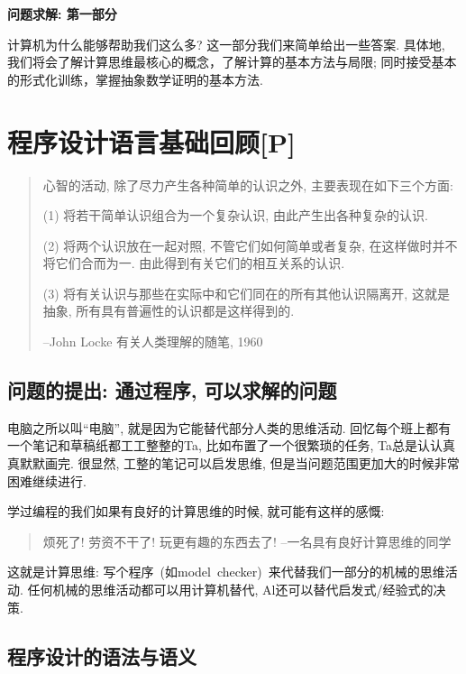 
\begin{center}
\textbf{问题求解: 第一部分}	
\end{center}

计算机为什么能够帮助我们这么多? 这一部分我们来简单给出一些答案. 具体地, 我们将会了解计算思维最核心的概念，了解计算的基本方法与局限; 同时接受基本的形式化训练，掌握抽象数学证明的基本方法. 


\chapter{程序设计语言基础回顾[P]}
\begin{quote}
	心智的活动, 除了尽力产生各种简单的认识之外, 主要表现在如下三个方面:

(1) 将若干简单认识组合为一个复杂认识, 由此产生出各种复杂的认识. 

(2) 将两个认识放在一起对照, 不管它们如何简单或者复杂, 在这样做时并不将它们合而为一. 由此得到有关它们的相互关系的认识. 

(3) 将有关认识与那些在实际中和它们同在的所有其他认识隔离开, 这就是抽象, 所有具有普遍性的认识都是这样得到的. 

\hfill --John Locke 有关人类理解的随笔, 1960

\end{quote}

\section{问题的提出: 通过程序, 可以求解的问题}

电脑之所以叫“电脑”, 就是因为它能替代部分人类的思维活动. 回忆每个班上都有一个笔记和草稿纸都工工整整的Ta, 比如布置了一个很繁琐的任务, Ta总是认认真真默默画完. 很显然, 工整的笔记可以启发思维, 但是当问题范围更加大的时候非常困难继续进行. 	

学过编程的我们如果有良好的计算思维的时候, 就可能有这样的感慨: 

\begin{quote}
	烦死了! 劳资不干了! 玩更有趣的东西去了! \hfill --一名具有良好计算思维的同学
\end{quote}

这就是计算思维: 写个程序 (如model checker) 来代替我们一部分的机械的思维活动. 任何机械的思维活动都可以用计算机替代, Al还可以替代启发式/经验式的决策. 

\section{程序设计的语法与语义}

